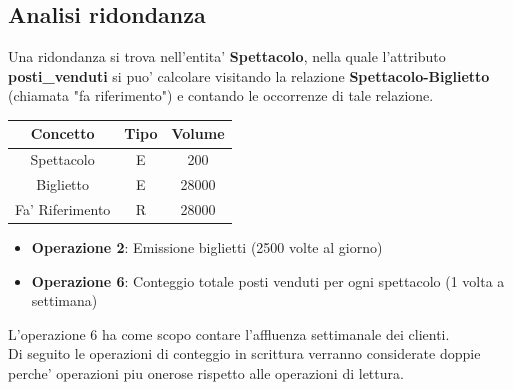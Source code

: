\documentclass[10pt]{article}
\begin{document}
	\subsection{Analisi ridondanza}	
	Una ridondanza si trova nell'entita' \textbf{Spettacolo}, nella quale l'attributo \textbf{posti\_venduti} si puo' calcolare visitando la relazione \textbf{Spettacolo-Biglietto} (chiamata "fa riferimento") e contando le occorrenze di tale relazione.
	\begin{table}[!h]
		\centering
		\begin{tabular}{|c|c|c|}
			\hline
			\textbf{Concetto} & \textbf{Tipo} & \textbf{Volume} \\
			\hline
			Spettacolo & E & 200 \\
			\hline
			Biglietto & E & 28000 \\
			\hline
			Fa' Riferimento & R & 28000 \\
			\hline
		\end{tabular}
	\end{table}
	\begin{itemize}
		\item \textbf{Operazione 2}: Emissione biglietti (2500 volte al giorno)
		\item \textbf{Operazione 6}: Conteggio totale posti venduti per ogni spettacolo (1 volta a settimana)		
	\end{itemize}
	L'operazione 6 ha come scopo contare l'affluenza settimanale dei clienti.\\
	Di seguito le operazioni di conteggio in scrittura verranno considerate doppie perche' operazioni piu onerose rispetto alle operazioni di lettura.
\end{document}
